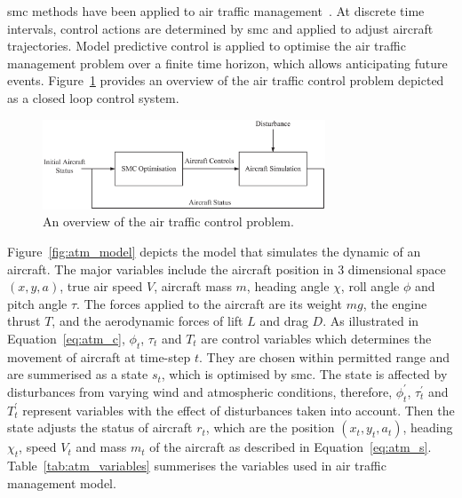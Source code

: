 \gls{smc} methods have been applied to air traffic management~\cite{kantas09,chau13acm,eele13cdc,eele13gnc,lymperopoulos10,lymperopoulos10thesis}.
At discrete time intervals, control actions are determined by \gls{smc} and applied to adjust aircraft trajectories.
Model predictive control is applied to optimise the air traffic management problem over a finite time horizon, which allows anticipating future events.
Figure~\ref{fig:smc_mpc} provides an overview of the air traffic control problem depicted as a closed loop control system.

\begin{figure}[ht]
\begin{center}
\includegraphics[width=0.75\textwidth]{2_background/figures/smc_mpc}
\end{center}
\caption{An overview of the air traffic control problem.}
\label{fig:smc_mpc}
\end{figure}

Figure~\ref{fig:atm_model} depicts the model that simulates the dynamic of an aircraft.
The major variables include the aircraft position in 3 dimensional space $(x,y,a)$, true air speed $V$, aircraft mass $m$, heading angle $\chi$, roll angle $\phi$ and pitch angle $\tau$.
The forces applied to the aircraft are its weight $mg$, the engine thrust $T$, and the aerodynamic forces of lift $L$ and drag $D$.
As illustrated in Equation~\ref{eq:atm_c}, $\phi_t$, $\tau_t$ and $T_t$ are control variables which determines the movement of aircraft at time-step $t$.
They are chosen within permitted range and are summerised as a state $s_t$, which is optimised by \gls{smc}.
The state is affected by disturbances from varying wind and atmospheric conditions, therefore, $\phi^{\prime}_t$, $\tau^{\prime}_t$ and $T^{\prime}_t$ represent variables with the effect of disturbances taken into account.
Then the state adjusts the status of aircraft $r_{t}$, which are the position $(x_t, y_t, a_t)$, heading $\chi_t$, speed $V_t$ and mass $m_t$ of the aircraft as described in Equation~\ref{eq:atm_s}.
Table~\ref{tab:atm_variables} summerises the variables used in air traffic management model.

